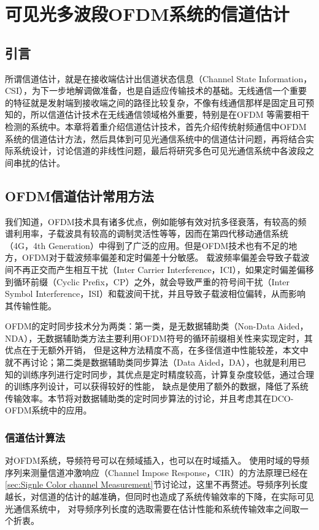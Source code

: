 \chapter{可见光多波段OFDM系统的信道估计}
\section{引言}
所谓信道估计，就是在接收端估计出信道状态信息（Channel State Information，CSI），为下一步地解调做准备，也是自适应传输技术的基础。无线通信一个重要的特征就是发射端到接收端之间的路径比较复杂，不像有线通信那样是固定且可预知的，所以信道估计技术在无线通信领域格外重要，特别是在OFDM 等需要相干检测的系统中。本章将着重介绍信道估计技术，首先介绍传统射频通信中OFDM 系统的信道估计方法，然后具体到可见光通信系统中的信道估计问题，再将结合实际系统设计，讨论信道的非线性问题，最后将研究多色可见光通信系统中各波段之间串扰的估计。
\section{OFDM信道估计常用方法}
我们知道，OFDM技术具有诸多优点，例如能够有效对抗多径衰落，有较高的频谱利用率，子载波具有较高的调制灵活性等等，因而在第四代移动通信系统（4G，4th Generation）中得到了广泛的应用。但是OFDM技术也有不足的地方，OFDM对于载波频率偏差和定时偏差十分敏感。
载波频率偏差会导致子载波间不再正交而产生相互干扰（Inter Carrier Interference，ICI），如果定时偏差偏移到循环前缀（Cyclic Prefix，CP）之外，就会导致严重的符号间干扰（Inter Symbol Interference，ISI）和载波间干扰，并且导致子载波相位偏转，从而影响其传输性能。

OFDM的定时同步技术分为两类：第一类，是无数据辅助类（Non-Data Aided，NDA），无数据辅助类方法主要利用OFDM符号的循环前缀相关性来实现定时\cite{morelli2007synchronization}，其优点在于无额外开销，
但是这种方法精度不高，在多径信道中性能较差，本文中就不再讨论；第二类是数据辅助类同步算法（Data Aided，DA），也就是利用已知的训练序列进行定时同步，其优点是定时精度较高，计算复杂度较低，通过合理的训练序列设计，可以获得较好的性能，
缺点是使用了额外的数据，降低了系统传输效率。本节将对数据辅助类的定时同步算法的讨论，并且考虑其在DCO-OFDM系统中的应用。


\subsection{ 信道估计算法 }
对OFDM系统，导频符号可以在频域插入，也可以在时域插入。
使用时域的导频序列来测量信道冲激响应（Channel Impose Response，CIR）的方法原理已经在\ref{sec:Signle Color channel Measurement}节讨论过，这里不再赘述。导频序列长度越长，对信道的估计的越准确，但同时也造成了系统传输效率的下降，在实际可见光通信系统中，
对导频序列长度的选取需要在估计性能和系统传输效率之间取一个折衷。

